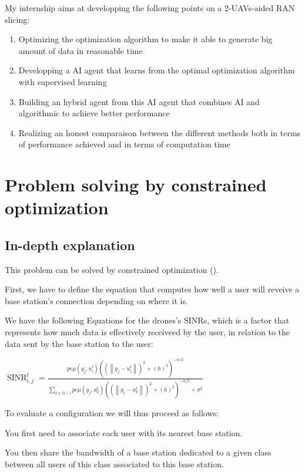 \documentclass[letterpaper]{article}
\begin{document}
My internship aims at developping the following points on a 2-UAVs-aided RAN slicing:

\begin{enumerate}
    \item Optimizing the optimization algorithm to make it able to generate big amount of data in reasonable time
    \item Developping a AI agent that learns from the optimal optimization algorithm with supervised learning
    \item Building an hybrid agent from this AI agent that combines AI and algorithmic to achieve better performance
    \item Realizing an honest comparaison between the different methods both in terms of performance achieved and in terms of computation time
\end{enumerate}


\section{Problem solving by constrained optimization}

\subsection{In-depth explanation}

This problem can be solved by constrained optimization (\hspace{1sp}\cite{main_article}).

First, we have to define the equation that computes how well a user will reveive a base station's connection depending on where it is.

We have the following Equations for the drones's SINRs, which is a factor that represents how much data is effectively receiveed by the user, in relation to the data sent by the base station to the user:

$\operatorname{SINR}_{i, j}^t=\frac{p c \mu\left(y_j, u_i^t\right)\left(\left(\left\|y_j-u_i^t\right\|\right)^2+\left(h\right)^2\right)^{-\alpha / 2}}{\sum\limits_{k \in \mathcal{U} \backslash i} p c \mu\left(y_j, u_k^t\right)\left(\left(\left\|y_j-u_k^t\right\|\right)^2+\left(h\right)^2\right)^{-\alpha / 2}+\sigma^2}$

To evaluate a configuration we will thus proceed as follows:

You first need to associate each user with its nearest base station.

You then share the bandwidth of a base station dedicated to a given class between all users of this class associated to this base station.
\end{document}
